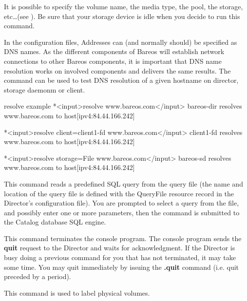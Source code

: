 \begin{description}
It is possible to specify the volume name, the media type, the pool, the
storage, etc\dots (see ).
Be sure that your storage device is idle when you decide to run this command.

\item [resolve]
    In the configuration files, Addresses can (and normally should) be specified as DNS names.
    As the different components of Bareos will establish network connections to other Bareos components,
    it is important that DNS name resolution works on involved components and delivers the same results.
    The  command can be used to test DNS resolution of a given hostname 
    on director, storage daemonm or client.

\begin{bconsole}{resolve example}
*<input>resolve www.bareos.com</input>
bareos-dir resolves www.bareos.com to host[ipv4:84.44.166.242]

*<input>resolve client=client1-fd www.bareos.com</input>
client1-fd resolves www.bareos.com to host[ipv4:84.44.166.242]

*<input>resolve storage=File www.bareos.com</input>
bareos-sd resolves www.bareos.com to host[ipv4:84.44.166.242]
\end{bconsole}


\item [query]
   \label{sec:bcommandQuery}
   This command reads a predefined SQL query from  the query file (the name and
   location of the  query file is defined with the QueryFile resource record in
   the Director's configuration file). You are prompted to select  a query from
   the file, and possibly enter one or more parameters,  then the command is
   submitted to the Catalog database SQL engine.

\item [quit]
   This command terminates the console program. The  console program sends the
   {\bf quit} request to the Director  and waits for acknowledgment. If the
   Director is busy doing  a previous command for you that has not terminated, it
   may  take some time. You may quit immediately by issuing the  {\bf .quit}
   command (i.e. quit preceded by a period).

\item [relabel]
   This command is used to label physical volumes.


\end{description}
